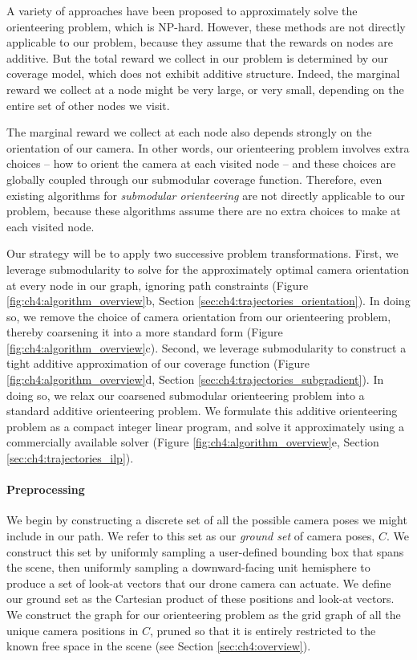 A variety of approaches have been proposed to approximately solve the orienteering problem, which is NP-hard.
However, these methods are not directly applicable to our problem, because they assume that the rewards on nodes are additive.
But the total reward we collect in our problem is determined by our coverage model, which does not exhibit additive structure.
Indeed, the marginal reward we collect at a node might be very large, or very small, depending on the entire set of other nodes we visit.


The marginal reward we collect at each node also depends strongly on the orientation of our camera. In other words, our orienteering problem involves extra choices -- how to orient the camera at each visited node -- and these choices are globally coupled through our submodular coverage function. Therefore, even existing algorithms for \emph{submodular orienteering} \cite{chekuri:2012,chekuri:2005,heng:2015,singh:2009a,singh:2009b,zhang:2016} are not directly applicable to our problem, because these algorithms assume there are no extra choices to make at each visited node.

Our strategy will be to apply two successive problem transformations.
First, we leverage submodularity to solve for the approximately optimal camera orientation at every node in our graph, ignoring path constraints (Figure \ref{fig:ch4:algorithm_overview}b, Section \ref{sec:ch4:trajectories_orientation}).
In doing so, we remove the choice of camera orientation from our orienteering problem, thereby coarsening it into a more standard form (Figure \ref{fig:ch4:algorithm_overview}c).
Second, we leverage submodularity to construct a tight additive approximation of our coverage function (Figure \ref{fig:ch4:algorithm_overview}d, Section \ref{sec:ch4:trajectories_subgradient}).
In doing so, we relax our coarsened submodular orienteering problem into a standard additive orienteering problem.
We formulate this additive orienteering problem as a compact integer linear program, and solve it approximately using a commercially available solver (Figure \ref{fig:ch4:algorithm_overview}e, Section \ref{sec:ch4:trajectories_ilp}).

\paragraph{Preprocessing}
We begin by constructing a discrete set of all the possible camera poses we might include in our path.
We refer to this set as our \emph{ground set} of camera poses, $C$.
We construct this set by uniformly sampling a user-defined bounding box that spans the scene, then uniformly sampling a downward-facing unit hemisphere to produce a set of look-at vectors that our drone camera can actuate. We define our ground set as the Cartesian product of these positions and look-at vectors.
We construct the graph for our orienteering problem as the grid graph of all the unique camera positions in $C$, pruned so that it is entirely restricted to the known free space in the scene  (see Section \ref{sec:ch4:overview}).

